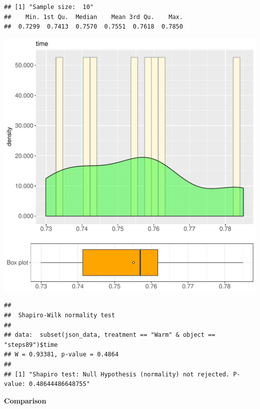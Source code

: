 \documentclass{article}\usepackage[]{graphicx}\usepackage[]{color}
\makeatletter
\def\maxwidth{ %
  \ifdim\Gin@nat@width>\linewidth
    \linewidth
  \else
    \Gin@nat@width
  \fi
}
\newenvironment{kframe}{%
 \def\at@end@of@kframe{}%
 \ifinner\ifhmode%
  \def\at@end@of@kframe{\end{minipage}}%
  \begin{minipage}{\columnwidth}%
 \fi\fi%
 \def\FrameCommand##1{\hskip\@totalleftmargin \hskip-\fboxsep
 \colorbox{shadecolor}{##1}\hskip-\fboxsep
     \hskip-\linewidth \hskip-\@totalleftmargin \hskip\columnwidth}%
 \MakeFramed {\advance\hsize-\width
   \@totalleftmargin\z@ \linewidth\hsize
   \@setminipage}}%
 {\par\unskip\endMakeFramed%
 \at@end@of@kframe}
\newenvironment{knitrout}{}{} %
\makeatother
\begin{document}
\begin{knitrout}
\color{fgcolor}\begin{kframe}
\begin{verbatim}
## [1] "Sample size:  10"
##    Min. 1st Qu.  Median    Mean 3rd Qu.    Max. 
##  0.7299  0.7413  0.7570  0.7551  0.7618  0.7850
\end{verbatim}
\end{kframe}
\includegraphics[width=\maxwidth]{figure/RH1_Warm_steps89-1} 
\begin{kframe}\begin{verbatim}
## 
## 	Shapiro-Wilk normality test
## 
## data:  subset(json_data, treatment == "Warm" & object == "steps89")$time
## W = 0.93381, p-value = 0.4864
## 
## [1] "Shapiro test: Null Hypothesis (normality) not rejected. P-value: 0.48644486648755"
\end{verbatim}
\end{kframe}
\end{knitrout}
  
 \textbf{Comparison}
  
\end{document}
